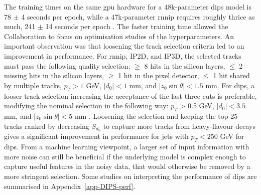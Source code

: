 The training times on the same \gls{gpu} hardware for a 48k-parameter \gls{dips} model is 78 $\pm$ 4 seconds per epoch, while a 47k-parameter \gls{rnnip} requires roughly thrice as much, 241 $\pm$ 14 seconds per epoch \cite{ATL-PHYS-PUB-2020-014}. The faster training time allowed the Collaboration to focus on optimisation studies of the hyperparameters. An important observation was that loosening the track selection criteria led to an improvement in performance. For \gls{rnnip}, IP2D, and IP3D, the selected tracks must pass the following quality selection: $\geq$ 8 hits in the silicon layers, $\leq$ 2 missing hits in the silicon layers, $\geq$ 1 hit in the pixel detector, $\leq$ 1 hit shared by multiple tracks, $p_T > 1$ GeV, $|d_0| < 1$ mm, and $|z_0 \sin\theta| < 1.5$ mm. For \gls{dips}, a looser track selection increasing the acceptance of the last three cuts is preferable, modifying the nominal selection in the following way: $p_T$ > 0.5 GeV, $|d_0| < 3.5$ mm, and $|z_0 \sin\theta| < 5$ mm \cite{ATL-PHYS-PUB-2020-014}. Loosening the selection and keeping the top 25 tracks ranked by decreasing $S_{d_0}$ to capture more tracks from heavy-flavour decays gives a significant improvement in performance for jets with $p_T < 250$ GeV for \gls{dips}. From a machine learning viewpoint, a larger set of input information with more noise can still be beneficial if the underlying model is complex enough to capture useful features in the noisy data, that would otherwise be removed by a more stringent selection. Some studies on interpreting the performance of \gls{dips} are summarised in Appendix~\ref{app-DIPS-perf}. %

